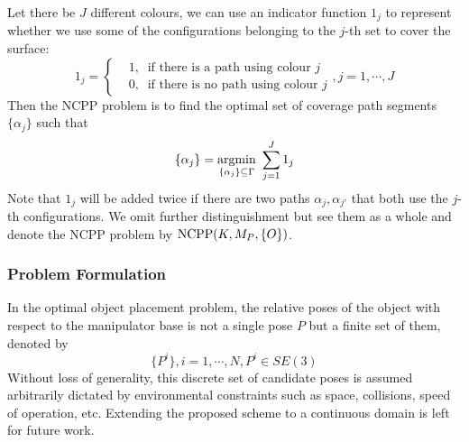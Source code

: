 \documentclass[letterpaper,journal]{IEEEtran}
\begin{document}
Let there be $J$ different colours, we can use an indicator function $1_j$ to represent whether we use some of the configurations belonging to the $j$-th set to cover the surface: 
\begin{equation}
1_j =\left\{
\begin{aligned}
&1,\ \mbox{ if there is a path using colour }j\\
&0,\ \mbox{ if there is no path using colour }j 
\end{aligned}
\right., j = 1, \cdots, J
\end{equation}
Then the NCPP problem is to find the optimal set of coverage path segments $\{\alpha_j\}$ such that  
\begin{equation}\label{equ_NCPP}
\{\alpha_j\} = \mathop{{\rm argmin}}\limits_{\{\alpha_j\}\subseteq \Gamma}~\sum\limits_{j = 1}^J 1_j
\end{equation}
Note that $1_j$ will be added twice if there are two paths $\alpha_j, \alpha_{j'}$ that both use the $j$-th configurations. We omit further distinguishment but see them as a whole and denote the NCPP problem by ${\rm NCPP}(K, M_P, \{O\})$. 

\subsubsection{Problem Formulation}
In the optimal object placement problem, the relative poses of the object with respect to the manipulator base is not a single pose $P$ but a finite set of them, denoted by 
\begin{equation}
\{P^i\}, i = 1, \cdots, N, P^i\in SE(3)
\end{equation}
Without loss of generality, this discrete set of candidate poses is assumed arbitrarily dictated by environmental constraints such as space, collisions, speed of operation, etc. Extending the proposed scheme to a continuous domain is left for future work.
\end{document}
